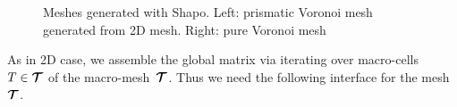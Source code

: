\begin{figure}[H]
	\centering
	\begin{subfigure}{.1\linewidth}\end{subfigure}%
	\begin{subfigure}{.4\linewidth}
		\centering
	\end{subfigure}%
	\begin{subfigure}{.4\linewidth}
		\centering
	\end{subfigure}%
	\begin{subfigure}{.1\linewidth}\end{subfigure}%
	\caption{Meshes generated with Shapo. Left: prismatic Voronoi mesh generated from 2D mesh. Right: pure Voronoi mesh}
	\label{fig:shapo}		
\end{figure}

As in 2D case, we assemble the global matrix via iterating over macro-cells~$T \in {\boldsymbol{\mathbf{\mathcal T}}}$ of the macro-mesh~${\boldsymbol{\mathbf{\mathcal T}}}$. Thus we need the following interface for the mesh~${\boldsymbol{\mathbf{\mathcal T}}}$.

